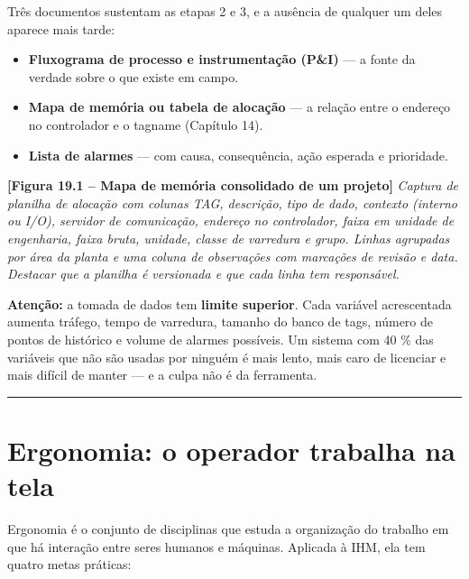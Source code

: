 Três documentos sustentam as etapas 2 e 3, e a ausência de qualquer um deles aparece mais tarde:

\begin{itemize}
\tightlist
\item
  \textbf{Fluxograma de processo e instrumentação (P\&I)} --- a fonte da verdade sobre o que existe em campo.
\item
  \textbf{Mapa de memória ou tabela de alocação} --- a relação entre o endereço no controlador e o tagname
  (Capítulo 14).
\item
  \textbf{Lista de alarmes} --- com causa, consequência, ação esperada e prioridade.
\end{itemize}

\begin{caixafigura}

\textbf{{[}Figura 19.1 -- Mapa de memória consolidado de um projeto{]}}
\emph{Captura de planilha de alocação com colunas TAG, descrição, tipo de dado, contexto (interno ou I/O), servidor de comunicação, endereço no controlador, faixa em unidade de engenharia, faixa bruta, unidade, classe de varredura e grupo. Linhas agrupadas por área da planta e uma coluna de observações com marcações de revisão e data. Destacar que a planilha é versionada e que cada linha tem responsável.}

\end{caixafigura}

\begin{caixaatencao}

\textbf{Atenção:} a tomada de dados tem \textbf{limite superior}. Cada variável acrescentada aumenta
tráfego, tempo de varredura, tamanho do banco de tags, número de pontos de histórico e volume de
alarmes possíveis. Um sistema com 40 \% das variáveis que não são usadas por ninguém é mais lento,
mais caro de licenciar e mais difícil de manter --- e a culpa não é da ferramenta.

\end{caixaatencao}

\begin{center}\rule{0.5\linewidth}{0.5pt}\end{center}

\section{Ergonomia: o operador trabalha na tela}\label{ergonomia-o-operador-trabalha-na-tela}

Ergonomia é o conjunto de disciplinas que estuda a organização do trabalho em que há interação entre
seres humanos e máquinas. Aplicada à IHM, ela tem quatro metas práticas:

